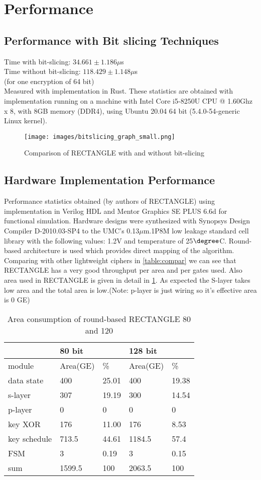 \documentclass[final]{transcrypto}
\begin{document}
\section{Performance}
\subsection{Performance with Bit slicing Techniques}
\label{Soft}
Time with bit-slicing: $34.661\pm 1.186\mu $s\\
Time without bit-slicing: $118.429\pm 1.148 \mu $s\\
(for one encryption of 64 bit)\\
Measured with implementation in Rust. These statistics are obtained with implementation running on a machine with Intel Core i5-8250U CPU @ 1.60Ghz x 8, with 8GB memory (DDR4), using Ubuntu 20.04 64 bit (5.4.0-54-generic Linux kernel).
\begin{figure}[H]
\caption{Comparison of RECTANGLE with and without bit-slicing}
\centering
\texttt{[image: images/bitslicing\_graph\_small.png]}
\end{figure}
\subsection{Hardware Implementation Performance}
Performance statistics obtained (by authors of RECTANGLE) using implementation in Verilog HDL and Mentor Graphics SE PLUS 6.6d for functional simulation. Hardware designs were synthesized with Synopsys Design Compiler D-2010.03-SP4 to the UMC's 0.13$\mu$m.1P8M low leakage standard cell library with the following values: 1.2V and temperature of 25$\degree$C. Round-based architecture is used which provides direct mapping of the algorithm.\cite{rectangle}\\
Comparing with other lightweight ciphers in \ref{table:compar} we can see that RECTANGLE has a very good throughput per area and per gates used. Also area used in RECTANGLE is given in detail in \ref{table:area}. As expected the S-layer takes low area and the total area is low.(Note: p-layer is just wiring so it's effective area is 0 GE)
\begin{table}[H]
	\centering
	\caption{Area consumption of round-based RECTANGLE 80 and 120}
	\begin{tabular}{|l||l|l|l|l|}
		\hline
&80 bit&&128 bit&\\
\hline
module& Area(GE) & \% & Area(GE) & \% \\ \hline
\hline
data state & 400 & 25.01 & 400 & 19.38\\ \hline
s-layer & 307 & 19.19 & 300 & 14.54\\ \hline
p-layer & 0 & 0 & 0 & 0\\ \hline
key XOR & 176 & 11.00 & 176 & 8.53\\ \hline
key schedule & 713.5 & 44.61 & 1184.5 & 57.4\\ \hline
FSM & 3 & 0.19 & 3 & 0.15\\ \hline
sum & 1599.5 & 100 & 2063.5 & 100\\ \hline
	\end{tabular}
	\label{table:area}
\end{table}
\end{document}
